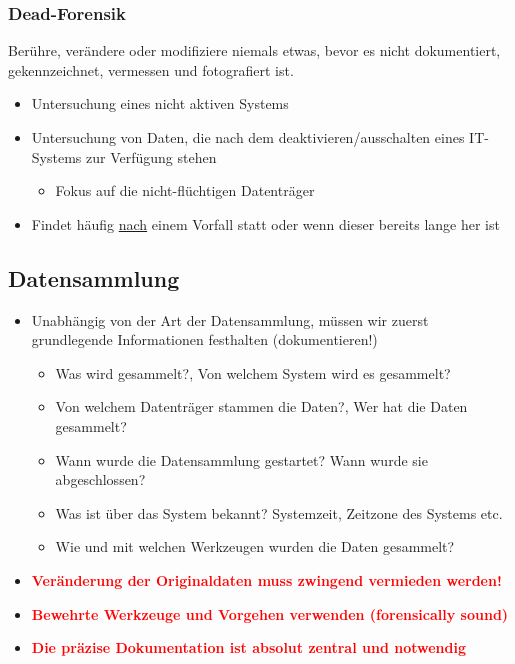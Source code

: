 \subsubsection{Dead-Forensik}
Berühre, verändere oder modifiziere niemals etwas, bevor es nicht dokumentiert, gekennzeichnet, vermessen und fotografiert ist.

\begin{itemize}
    \item Untersuchung eines nicht aktiven Systems
    \item Untersuchung von Daten, die nach dem deaktivieren/ausschalten eines IT-Systems zur Verfügung stehen
    \begin{itemize}
        \item Fokus auf die nicht-flüchtigen Datenträger
    \end{itemize}
    \item Findet häufig \underline{nach} einem Vorfall statt oder wenn dieser bereits lange her ist
\end{itemize}

\subsection{Datensammlung}
\begin{itemize}
    \item Unabhängig von der Art der Datensammlung, müssen wir zuerst grundlegende Informationen festhalten (dokumentieren!)
    \begin{itemize}
        \item Was wird gesammelt?, Von welchem System wird es gesammelt?
        \item Von welchem Datenträger stammen die Daten?, Wer hat die Daten gesammelt?
        \item Wann wurde die Datensammlung gestartet? Wann wurde sie abgeschlossen?
        \item Was ist über das System bekannt? Systemzeit, Zeitzone des Systems etc.
        \item Wie und mit welchen Werkzeugen wurden die Daten gesammelt?
    \end{itemize}
    \item \textbf{\textcolor{red}{Veränderung der Originaldaten muss zwingend vermieden werden!}}
    \item \textbf{\textcolor{red}{Bewehrte Werkzeuge und Vorgehen verwenden (forensically sound)}}
    \item \textbf{\textcolor{red}{Die präzise Dokumentation ist absolut zentral und notwendig}}
\end{itemize}

